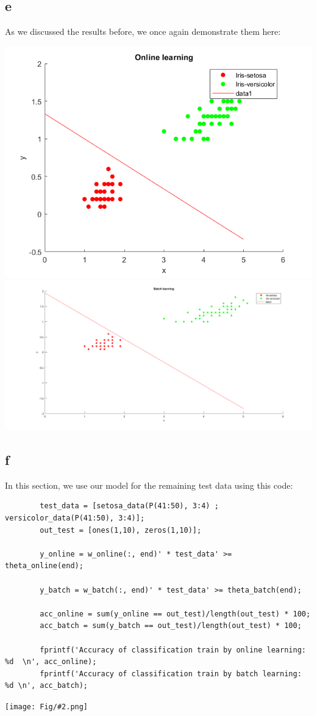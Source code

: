 \documentclass[]{article}
\newcommand{\pict}[2]{\begin{center}
		\texttt{[image: Fig/\#2.png]}
\end{center}}
\begin{document}
	\subsection*{e}
	As we discussed the results before, we once again demonstrate them here:
	\begin{center}
		\includegraphics[width=0.35\linewidth]{Fig/Q2_F3.png}
		\qquad\qquad
		\includegraphics[width=0.55\linewidth]{Fig/Q2_F4.png}
	\end{center}

	\subsection*{f}
	In this section, we use our model for the remaining test data using this code:
	\begin{lstlisting}
		test_data = [setosa_data(P(41:50), 3:4) ; versicolor_data(P(41:50), 3:4)];
		out_test = [ones(1,10), zeros(1,10)];
		
		y_online = w_online(:, end)' * test_data' >= theta_online(end);
		
		y_batch = w_batch(:, end)' * test_data' >= theta_batch(end);
		
		acc_online = sum(y_online == out_test)/length(out_test) * 100;
		acc_batch = sum(y_batch == out_test)/length(out_test) * 100;
		
		fprintf('Accuracy of classification train by online learning: %d  \n', acc_online);
		fprintf('Accuracy of classification train by batch learning: %d \n', acc_batch);
	\end{lstlisting}
	\pict{1}{Q2_F8}
	
\end{document}
